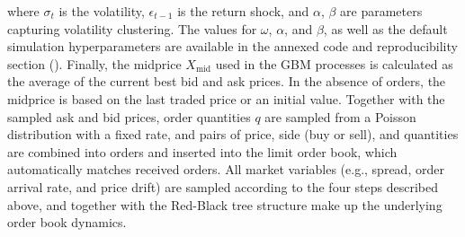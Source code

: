 \documentclass[11pt]{article}
\begin{document}
    where \( \sigma_t \) is the volatility, \( \epsilon_{t-1} \) is the return shock, and \( \alpha \), \( \beta \) are parameters capturing volatility clustering.
    The values for $\omega$, $\alpha$, and $\beta$, as well as the default simulation hyperparameters are
    available in the annexed code and reproducibility section ().
    Finally, the midprice \( X_{\text{mid}} \) used in the GBM processes is calculated as the average of the current best bid and ask prices.
    In the absence of orders, the midprice is based on the last traded price or an initial value.
    Together with the sampled ask and bid prices, order quantities \( q \) are sampled from a Poisson distribution with a fixed rate,
    and pairs of price, side (buy or sell), and quantities are combined into orders and inserted into the limit order book,
    which automatically matches received orders.
    All market variables (e.g., spread, order arrival rate, and price drift) are sampled according to the four steps described above,
    and together with the Red-Black tree structure make up the underlying order book dynamics.
\end{document}
